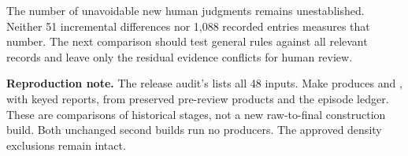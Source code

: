 The number of unavoidable new human judgments remains unestablished. Neither
51 incremental differences nor 1,088 recorded entries measures that number.
The next comparison should test general rules against all relevant records and
leave only the residual evidence conflicts for human review.

\textbf{Reproduction note.}
The release audit's  lists all 48 inputs.
Make produces  and
, with keyed reports, from preserved
pre-review products and the episode ledger. These are comparisons of historical
stages, not a new raw-to-final construction build. Both unchanged second builds
run no producers. The approved density exclusions remain intact.
